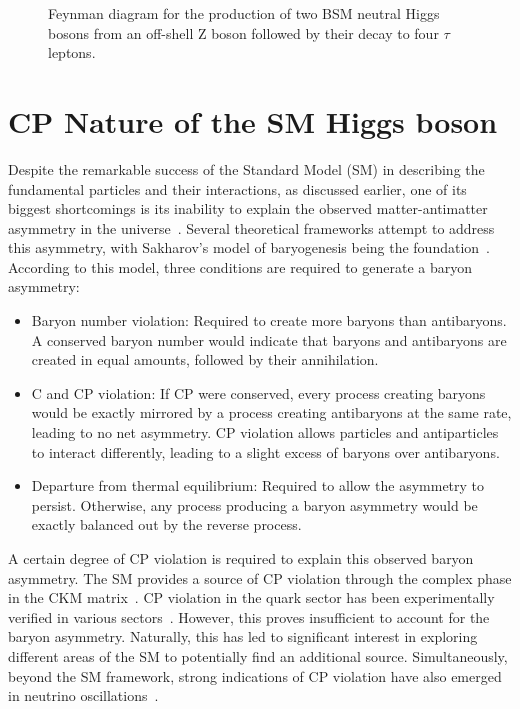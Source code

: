 \begin{figure}[h]
\centering

\caption{Feynman diagram for the production of two BSM neutral Higgs bosons from an off-shell Z boson followed by their decay to four $\tau$ leptons.}
\label{Figure:Chapter2_Feynman4tau}
\end{figure}

\section{CP Nature of the SM Higgs boson}

Despite the remarkable success of the Standard Model (SM) in describing the fundamental particles and their interactions, as discussed earlier, one of its biggest shortcomings is its inability to explain the observed matter-antimatter asymmetry in the universe~\cite{MatterAntimatter}. Several theoretical frameworks attempt to address this asymmetry, with Sakharov's model of baryogenesis being the foundation~\cite{Sakharov}. According to this model, three conditions are required to generate a baryon asymmetry:

\begin{itemize}
    \item Baryon number violation: Required to create more baryons than antibaryons. A conserved baryon number would indicate that baryons and antibaryons are created in equal amounts, followed by their annihilation.
    \item C and CP violation: If CP were conserved, every process creating baryons would be exactly mirrored by a process creating antibaryons at the same rate, leading to no net asymmetry. CP violation allows particles and antiparticles to interact differently, leading to a slight excess of baryons over antibaryons.
    \item Departure from thermal equilibrium: Required to allow the asymmetry to persist. Otherwise, any process producing a baryon asymmetry would be exactly balanced out by the reverse process.
\end{itemize}

A certain degree of CP violation is required to explain this observed baryon asymmetry. The SM provides a source of CP violation through the complex phase in the CKM matrix~\cite{CKM_1,CKM_2}. CP violation in the quark sector has been experimentally verified in various sectors~\cite{CP_QuarkSector_1, CP_QuarkSector_2, CP_QuarkSector_3, CP_QuarkSector_4, 
CP_QuarkSector_5, CP_QuarkSector_6, CP_QuarkSector_7, CP_QuarkSector_8, 
CP_QuarkSector_9, CP_QuarkSector_10, CP_QuarkSector_11, CP_QuarkSector_12, 
CP_QuarkSector_13, CP_QuarkSector_14}. However, this proves insufficient to account for the baryon asymmetry. 
Naturally, this has led to significant interest in exploring different areas of the SM to potentially find an additional source. Simultaneously, beyond the SM framework, strong indications of CP violation have also emerged in neutrino oscillations~\cite{CP_Neutrino_Oscillations}. 

